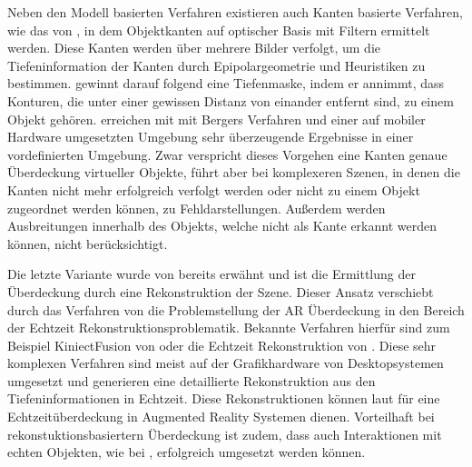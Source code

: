 Neben den Modell basierten Verfahren existieren auch Kanten basierte Verfahren, wie das von \citet{berger1997resolving}, in dem Objektkanten auf optischer Basis mit Filtern ermittelt werden. Diese Kanten werden über mehrere Bilder verfolgt, um die Tiefeninformation der Kanten durch Epipolargeometrie und Heuristiken zu bestimmen. \citet{berger1997resolving} gewinnt darauf folgend  eine Tiefenmaske, indem er annimmt, dass Konturen, die unter einer gewissen Distanz von einander entfernt sind, zu einem Objekt gehören. \citet{klein2004sensor} erreichen mit mit Bergers Verfahren und einer auf mobiler Hardware umgesetzten Umgebung sehr überzeugende Ergebnisse in einer vordefinierten Umgebung. Zwar verspricht dieses Vorgehen eine Kanten genaue Überdeckung virtueller Objekte, führt aber bei komplexeren Szenen, in denen die Kanten nicht mehr erfolgreich verfolgt werden oder nicht zu einem Objekt zugeordnet werden können, zu Fehldarstellungen. Außerdem werden Ausbreitungen innerhalb des Objekts, welche nicht als Kante erkannt werden können, nicht berücksichtigt.

Die letzte Variante wurde von \citet{breen1996interactive} bereits erwähnt und ist die Ermittlung der Überdeckung durch eine Rekonstruktion der Szene. Dieser Ansatz verschiebt durch das Verfahren von \citet{wloka1995resolving} die Problemstellung der AR Überdeckung in den Bereich der Echtzeit Rekonstruktionsproblematik. Bekannte Verfahren hierfür sind zum Beispiel KiniectFusion von \citet{newcombe2011kinectfusion} oder die Echtzeit Rekonstruktion von \citep{niessner2013real}. Diese sehr komplexen Verfahren sind meist auf der Grafikhardware von Desktopsystemen umgesetzt und generieren eine detaillierte Rekonstruktion aus den Tiefeninformationen in Echtzeit. Diese Rekonstruktionen können laut \citet{newcombe2011kinectfusion} für eine Echtzeitüberdeckung in Augmented Reality Systemen dienen. Vorteilhaft bei rekonstuktionsbasiertern Überdeckung ist zudem, dass auch Interaktionen mit echten Objekten, wie bei \citet{breen1996interactive}, erfolgreich umgesetzt werden können.



